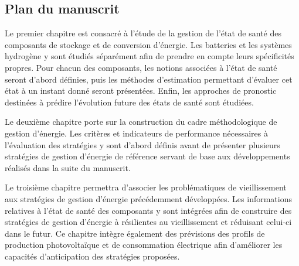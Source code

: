 \subsection{Plan du manuscrit}

Le premier chapitre est consacré à l'étude de la gestion de l'état de santé des composants de stockage et de conversion d'énergie. Les batteries et les systèmes hydrogène y sont étudiés séparément afin de prendre en compte leurs spécificités propres. Pour chacun des composants, les notions associées à l'état de santé seront d'abord définies, puis les méthodes d'estimation permettant d'évaluer cet état à un instant donné seront présentées. Enfin, les approches de pronostic destinées à prédire l'évolution future des états de santé sont étudiées.

Le deuxième chapitre porte sur la construction du cadre méthodologique de gestion d'énergie. Les critères et indicateurs de performance nécessaires à l'évaluation des stratégies y sont d'abord définis avant de présenter plusieurs stratégies de gestion d'énergie de référence servant de base aux développements réalisés dans la suite du manuscrit.

Le troisième chapitre permettra d'associer les problématiques de vieillissement aux stratégies de gestion d'énergie précédemment développées. Les informations relatives à l'état de santé des composants y sont intégrées afin de construire des stratégies de gestion d'énergie à résilientes au vieillissement et réduisant celui-ci dans le futur. Ce chapitre intègre également des prévisions des profils de production photovoltaïque et de consommation électrique afin d'améliorer les capacités d'anticipation des stratégies proposées.
\newpage